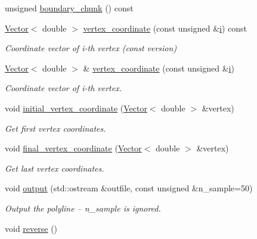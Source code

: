\begin{DoxyCompactItemize}
unsigned \hyperlink{classoomph_1_1TriangleMeshPolyLine_a4535773043c6b9516b81df42468294c1}{boundary\+\_\+chunk} () const
\item 
\hyperlink{classoomph_1_1Vector}{Vector}$<$ double $>$ \hyperlink{classoomph_1_1TriangleMeshPolyLine_adae759da7a0165a00c7af92e36092dd6}{vertex\+\_\+coordinate} (const unsigned \&\hyperlink{cfortran_8h_adb50e893b86b3e55e751a42eab3cba82}{i}) const
\begin{DoxyCompactList}\small\item\em Coordinate vector of i-\/th vertex (const version) \end{DoxyCompactList}\item 
\hyperlink{classoomph_1_1Vector}{Vector}$<$ double $>$ \& \hyperlink{classoomph_1_1TriangleMeshPolyLine_a8b90405e6926cdaf10506552280e828c}{vertex\+\_\+coordinate} (const unsigned \&\hyperlink{cfortran_8h_adb50e893b86b3e55e751a42eab3cba82}{i})
\begin{DoxyCompactList}\small\item\em Coordinate vector of i-\/th vertex. \end{DoxyCompactList}\item 
void \hyperlink{classoomph_1_1TriangleMeshPolyLine_ac5970458ab4954408d512495c003e5f0}{initial\+\_\+vertex\+\_\+coordinate} (\hyperlink{classoomph_1_1Vector}{Vector}$<$ double $>$ \&vertex)
\begin{DoxyCompactList}\small\item\em Get first vertex coordinates. \end{DoxyCompactList}\item 
void \hyperlink{classoomph_1_1TriangleMeshPolyLine_a6a110bac1436632fc4206eec2a96f8f4}{final\+\_\+vertex\+\_\+coordinate} (\hyperlink{classoomph_1_1Vector}{Vector}$<$ double $>$ \&vertex)
\begin{DoxyCompactList}\small\item\em Get last vertex coordinates. \end{DoxyCompactList}\item 
void \hyperlink{classoomph_1_1TriangleMeshPolyLine_a8306f0768e83e29aac7d0d2f9fb3c175}{output} (std\+::ostream \&outfile, const unsigned \&n\+\_\+sample=50)
\begin{DoxyCompactList}\small\item\em Output the polyline -- n\+\_\+sample is ignored. \end{DoxyCompactList}\item 
void \hyperlink{classoomph_1_1TriangleMeshPolyLine_aaf93f024dbc779f5b5448daccfa6fe7c}{reverse} ()
\end{DoxyCompactItemize}
